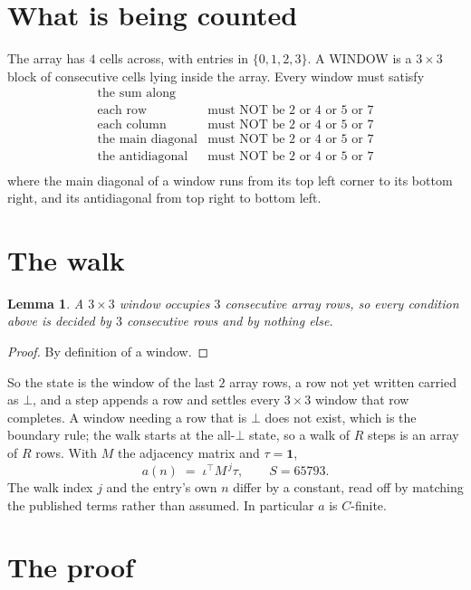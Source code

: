 \documentclass[11pt,a4paper]{article}
\theoremstyle{plain}
\newtheorem{lemma}[theorem]{Lemma}
\theoremstyle{definition}
\begin{document}
\section{What is being counted}

The array has $4$ cells across, with entries in $\{0,1,2,3\}$. A WINDOW is a $3\times3$ block
of consecutive cells lying inside the array. Every window must satisfy
\[
\begin{array}{ll}
\text{the sum along} & \text{} \\[2pt]
\text{each row} & \text{must NOT be 2 or 4 or 5 or 7} \\
\text{each column} & \text{must NOT be 2 or 4 or 5 or 7} \\
\text{the main diagonal} & \text{must NOT be 2 or 4 or 5 or 7} \\
\text{the antidiagonal} & \text{must NOT be 2 or 4 or 5 or 7} \\
\end{array}
\]
where the main diagonal of a window runs from its top left corner to its bottom right, and its
antidiagonal from top right to bottom left.

\section{The walk}

\begin{lemma}\label{lem:win}
A $3\times3$ window occupies $3$ consecutive array rows, so every condition above is
decided by $3$ consecutive rows and by nothing else.
\end{lemma}

\begin{proof}
By definition of a window.
\end{proof}

So the state is the window of the last $2$ array rows, a row not yet written carried as
$\bot$, and a step appends a row and settles every $3\times3$ window that row completes. A
window needing a row that is $\bot$ does not exist, which is the boundary rule; the walk starts
at the all-$\bot$ state, so a walk of $R$ steps is an array of $R$ rows. With $M$ the adjacency
matrix and $\tau=\mathbf{1}$,
\[
a(n)\;=\;\iota^{\!\top}M^{\,j}\tau ,\qquad S=65793.
\]
The walk index $j$ and the entry's own $n$ differ by a constant, read off by matching the
published terms rather than assumed. In particular $a$ is $C$-finite.

\section{The proof}
\end{document}
